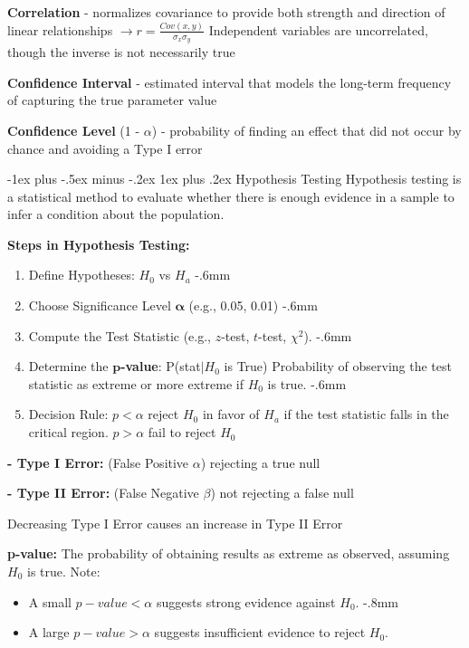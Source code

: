 \documentclass[10pt,landscape]{article}
\makeatletter
\renewcommand{\subsubsection}{\@startsection{subsubsection}{3}{0mm}%
                                {-1ex plus -.5ex minus -.2ex}%
                                {1ex plus .2ex}%
                                {\normalfont\small\bfseries}}
\makeatother
\begin{document}
\begin{multicols}{3}
\textbf{Correlation} - normalizes covariance to provide both strength and direction of linear relationships $\to r =  \frac{Cov(x,y)}{\sigma_x \sigma_y}$
Independent variables are uncorrelated,  though the inverse is not necessarily true

\newcommand*{\Perm}[2]{{}^{#1}\!P_{#2}}%
\newcommand*{\Comb}[2]{{}^{#1}C_{#2}}%

\textbf{Confidence Interval} - estimated interval that models the long-term frequency of capturing the true parameter value

\textbf{Confidence Level} (1 - $\alpha$) - probability of finding an effect that did not occur by chance and avoiding a Type I error

\subsubsection{Hypothesis Testing} 
\vspace{-.6mm}
Hypothesis testing is a statistical method to evaluate whether there is enough evidence in a sample to infer a condition about the population.

\textbf{Steps in Hypothesis Testing:}
\vspace{-.4mm}
\begin{enumerate}[leftmargin=5mm]
    \item Define Hypotheses: $H_0$ vs $H_a$
    \itemsep -.6mm
    \item Choose Significance Level $\boldsymbol{\alpha}$ (e.g., 0.05, 0.01)
    \itemsep -.6mm
    \item Compute the Test Statistic (e.g., $z$-test, $t$-test, $\chi^2$).
    \itemsep -.6mm
    \item Determine the $\boldsymbol p$\textbf{-value}: P(stat$|H_0$ is True) 
    Probability of observing the test statistic as extreme or more extreme if $H_0$ is true.
    \itemsep -.6mm
    \item Decision Rule: $p < \alpha$ reject $H_0$ in favor of $H_a$ if the test statistic falls in the critical region.
    $p > \alpha$ fail to reject $H_0$
\end{enumerate}

\textbf{- Type I Error:} (False Positive $\alpha$) rejecting a true null

\textbf{- Type II Error:} (False Negative $\beta$) not rejecting a false null

Decreasing Type I Error causes an increase in Type II Error

\smallskip
\textbf{p-value:} The probability of obtaining results as extreme as observed, assuming $H_0$ is true. Note:
\begin{itemize}[label={--},leftmargin=4mm]
    \itemsep -.8mm
    \item A small $p-value < \alpha$ suggests strong evidence against $H_0$.
    \itemsep -.8mm
    \item A large $p-value > \alpha$ suggests insufficient evidence to reject $H_0$.
\end{itemize}


\end{multicols}
\end{document}
